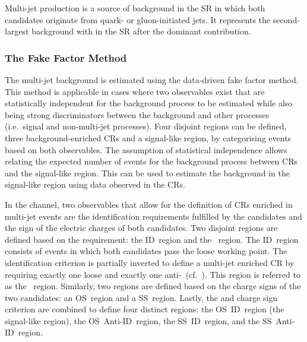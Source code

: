Multi-jet production is a source of background in the \hadhad SR in which both
\tauhadvis candidates originate from quark- or gluon-initiated jets. It
represents the second-largest background with \faketauhadvis in the \hadhad SR
after the dominant \ttbarFakes contribution.

\subsubsection{The Fake Factor Method}

The multi-jet background is estimated using the data-driven fake factor
method. This method is applicable in cases where two observables exist that are
statistically independent for the background process to be estimated while also
being strong discriminators between the background and other processes (i.e.\
signal and non-multi-jet processes). Four disjoint regions can be defined, three
background-enriched CRs and a signal-like region, by categorising events based
on both observables. The assumption of statistical independence allows relating
the expected number of events for the background process between CRs and the
signal-like region. This can be used to estimate the background in the
signal-like region using data observed in the CRs.

In the \hadhad channel, two observables that allow for the definition of CRs enriched in
multi-jet events are the identification requirements fulfilled by the \tauhadvis
candidates and the sign of the electric charges of both candidates. Two disjoint
regions are defined based on the \tauid requirement: the ID~region and the
\antiid~region. The ID~region consists of events in which both \tauhadvis
candidates pass the loose \tauid working point. The identification criterion is
partially inverted to define a multi-jet enriched CR by requiring exactly one
loose \tauhadvis and exactly one
anti-\tauhadvis~(cf.~). This region is referred
to as the \antiid~region. Similarly, two regions are defined based on the charge
signs of the two \tauhadvis candidates: an OS~region and a SS~region. Lastly,
the \tauid and charge sign criterion are combined to define four distinct
regions: the OS~ID~region (the signal-like region), the OS~Anti-ID~region, the
SS~ID~region, and the SS~Anti-ID~region.

